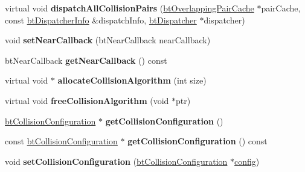 \begin{DoxyCompactItemize}
\item 
\hypertarget{classbt_collision_dispatcher_a7757447fd7c1a79c03adebffb8f1e38d}{virtual void {\bfseries dispatch\+All\+Collision\+Pairs} (\hyperlink{classbt_overlapping_pair_cache}{bt\+Overlapping\+Pair\+Cache} $\ast$pair\+Cache, const \hyperlink{structbt_dispatcher_info}{bt\+Dispatcher\+Info} \&dispatch\+Info, \hyperlink{classbt_dispatcher}{bt\+Dispatcher} $\ast$dispatcher)}\label{classbt_collision_dispatcher_a7757447fd7c1a79c03adebffb8f1e38d}

\item 
\hypertarget{classbt_collision_dispatcher_a53ec6fa98dde94222f4916bd980981e0}{void {\bfseries set\+Near\+Callback} (bt\+Near\+Callback near\+Callback)}\label{classbt_collision_dispatcher_a53ec6fa98dde94222f4916bd980981e0}

\item 
\hypertarget{classbt_collision_dispatcher_a55e5b450c6c3a03983109c4729060053}{bt\+Near\+Callback {\bfseries get\+Near\+Callback} () const }\label{classbt_collision_dispatcher_a55e5b450c6c3a03983109c4729060053}

\item 
\hypertarget{classbt_collision_dispatcher_a9cf562ead8073a0be062fa562e8b9afe}{virtual void $\ast$ {\bfseries allocate\+Collision\+Algorithm} (int size)}\label{classbt_collision_dispatcher_a9cf562ead8073a0be062fa562e8b9afe}

\item 
\hypertarget{classbt_collision_dispatcher_a61ee555a8eefe668be04f8f4084f8474}{virtual void {\bfseries free\+Collision\+Algorithm} (void $\ast$ptr)}\label{classbt_collision_dispatcher_a61ee555a8eefe668be04f8f4084f8474}

\item 
\hypertarget{classbt_collision_dispatcher_ac48d53e4cfee3a5d2335c82693f7bc1f}{\hyperlink{classbt_collision_configuration}{bt\+Collision\+Configuration} $\ast$ {\bfseries get\+Collision\+Configuration} ()}\label{classbt_collision_dispatcher_ac48d53e4cfee3a5d2335c82693f7bc1f}

\item 
\hypertarget{classbt_collision_dispatcher_a2b1fa387e16aba024c026b76ddce0bc7}{const \hyperlink{classbt_collision_configuration}{bt\+Collision\+Configuration} $\ast$ {\bfseries get\+Collision\+Configuration} () const }\label{classbt_collision_dispatcher_a2b1fa387e16aba024c026b76ddce0bc7}

\item 
\hypertarget{classbt_collision_dispatcher_a3bc97f728f28889f65b62613f293ff99}{void {\bfseries set\+Collision\+Configuration} (\hyperlink{classbt_collision_configuration}{bt\+Collision\+Configuration} $\ast$\hyperlink{structconfig__s}{config})}\label{classbt_collision_dispatcher_a3bc97f728f28889f65b62613f293ff99}


\end{DoxyCompactItemize}
